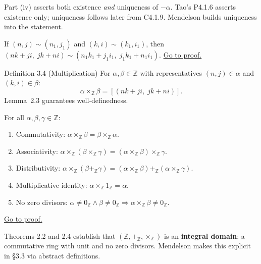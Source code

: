 \begin{remark*}
Part (iv) asserts both existence \emph{and} uniqueness of $-\alpha$.
Tao's P4.1.6 asserts existence only; uniqueness follows later from
C4.1.9.  Mendelson builds uniqueness into the statement.
\end{remark*}

\begin{lemma}
\label{lem:men-mul-welld}
If $(n,j) \sim (n_1,j_1)$ and $(k,i) \sim (k_1,i_1)$, then
$(nk+ji,\; jk+ni) \sim (n_1k_1+j_1i_1,\; j_1k_1+n_1i_1)$.
\hyperref[prf:men-mul-welld]{Go to proof.}
\end{lemma}

\begin{corollarybox}{Definition 3.4 (Multiplication)}
For $\alpha, \beta \in \mathbb{Z}$ with representatives
$(n,j) \in \alpha$ and $(k,i) \in \beta$:
\[
\alpha \times_{\mathbb{Z}} \beta = [(nk+ji,\; jk+ni)].
\]
Lemma~2.3 guarantees well-definedness.
\end{corollarybox}

\begin{theorem}
\label{thm:men-mul}
For all $\alpha, \beta, \gamma \in \mathbb{Z}$:
\begin{enumerate}
  \item[(i)] Commutativity: $\alpha \times_{\mathbb{Z}} \beta
    = \beta \times_{\mathbb{Z}} \alpha$.
  \item[(ii)] Associativity: $\alpha \times_{\mathbb{Z}}
    (\beta \times_{\mathbb{Z}} \gamma)
    = (\alpha \times_{\mathbb{Z}} \beta) \times_{\mathbb{Z}} \gamma$.
  \item[(iii)] Distributivity: $\alpha \times_{\mathbb{Z}}
    (\beta +_{\mathbb{Z}} \gamma)
    = (\alpha \times_{\mathbb{Z}} \beta)
    +_{\mathbb{Z}} (\alpha \times_{\mathbb{Z}} \gamma)$.
  \item[(iv)] Multiplicative identity: $\alpha \times_{\mathbb{Z}}
    1_{\mathbb{Z}} = \alpha$.
  \item[(v)] No zero divisors: $\alpha \neq 0_{\mathbb{Z}} \wedge
    \beta \neq 0_{\mathbb{Z}} \Rightarrow
    \alpha \times_{\mathbb{Z}} \beta \neq 0_{\mathbb{Z}}$.
\end{enumerate}
\hyperref[prf:men-mul]{Go to proof.}
\end{theorem}

\begin{remark*}
Theorems 2.2 and 2.4 establish that
$(\mathbb{Z}, +_\mathbb{Z}, \times_\mathbb{Z})$ is an
\textbf{integral domain}: a commutative ring with unit and no zero divisors.
Mendelson makes this explicit in \S3.3 via abstract definitions.
\end{remark*}


